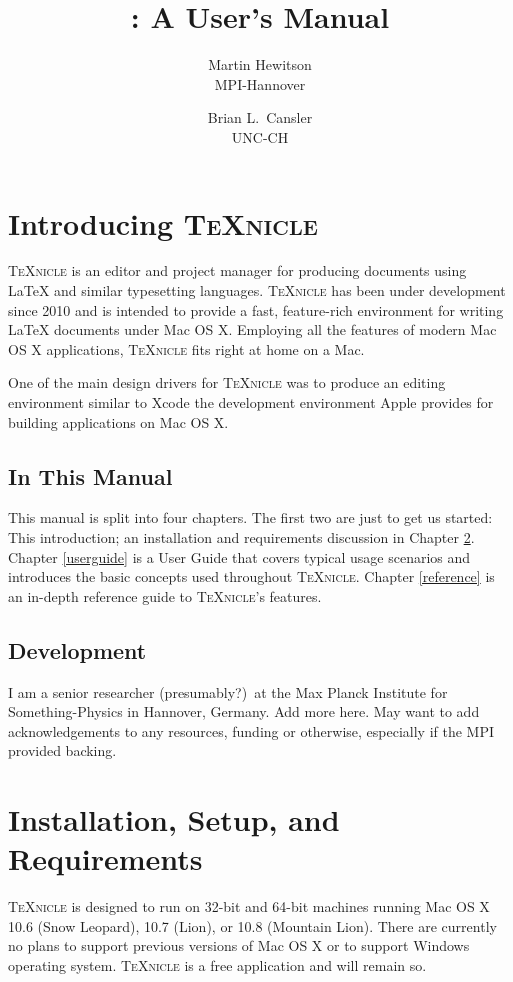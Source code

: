 \documentclass[11pt]{report}
\title{\texnicle: A User's Manual}
\author{Martin Hewitson\\MPI-Hannover \and Brian L.\ Cansler\\UNC-CH}
\date{}
\newcommand{\texnicle}{\textsc{TeXnicle}\xspace}
\begin{document}
\normalem
\maketitle

\tableofcontents

\chapter{Introducing \texnicle}
\label{intro}
\texnicle is an editor and project manager for producing documents using {\LaTeX} and similar typesetting languages. \texnicle has been under development since 2010 and is intended to provide a fast, feature-rich environment for writing {\LaTeX} documents under Mac OS X. Employing all the features of modern Mac OS X applications, \texnicle fits right at home on a Mac.

One of the main design drivers for \texnicle was to produce an editing environment similar to Xcode the development environment Apple provides for building applications on Mac OS X.

\section{In This Manual}
\label{inthismanual}
This manual is split into four chapters. The first two are just to get us started: This introduction; an installation and requirements discussion in Chapter \ref{requirements}. Chapter \ref{userguide} is a User Guide that covers typical usage scenarios and introduces the basic concepts used throughout \texnicle. Chapter \ref{reference} is an in-depth reference guide to \texnicle’s features.

\section{Development}
\label{dev}
I am a senior researcher (presumably?)\ at the Max Planck Institute for Something-Physics in Hannover, Germany. Add more here. May want to add acknowledgements to any resources, funding or otherwise, especially if the MPI provided backing.

\chapter{Installation, Setup, and Requirements}
\label{requirements}
\texnicle is designed to run on 32-bit and 64-bit machines running Mac OS X 10.6 (Snow Leopard), 10.7 (Lion), or 10.8 (Mountain Lion). There are currently no plans to support previous versions of Mac OS X or to support Windows operating system. \texnicle is a free application and will remain so.
\end{document}
